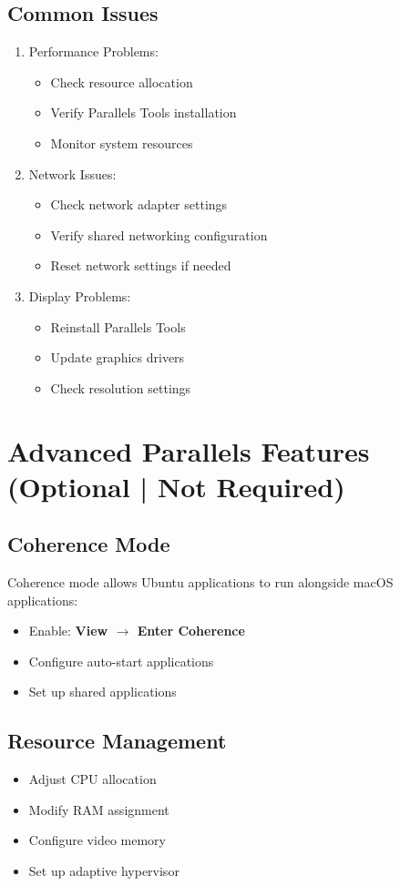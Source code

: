 \documentclass[11pt,a4paper]{article}
\begin{document}
\subsection{Common Issues}
\begin{enumerate}
    \item Performance Problems:
    \begin{itemize}
        \item Check resource allocation
        \item Verify Parallels Tools installation
        \item Monitor system resources
    \end{itemize}
    \item Network Issues:
    \begin{itemize}
        \item Check network adapter settings
        \item Verify shared networking configuration
        \item Reset network settings if needed
    \end{itemize}
    \item Display Problems:
    \begin{itemize}
        \item Reinstall Parallels Tools
        \item Update graphics drivers
        \item Check resolution settings
    \end{itemize}
\end{enumerate}


\section{Advanced Parallels Features (Optional | Not Required)}
\subsection{Coherence Mode}
Coherence mode allows Ubuntu applications to run alongside macOS applications:
\begin{itemize}
    \item Enable: \textbf{View $\rightarrow$ Enter Coherence}
    \item Configure auto-start applications
    \item Set up shared applications
\end{itemize}

\subsection{Resource Management}
\begin{itemize}
    \item Adjust CPU allocation
    \item Modify RAM assignment
    \item Configure video memory
    \item Set up adaptive hypervisor
\end{itemize}
\end{document}
